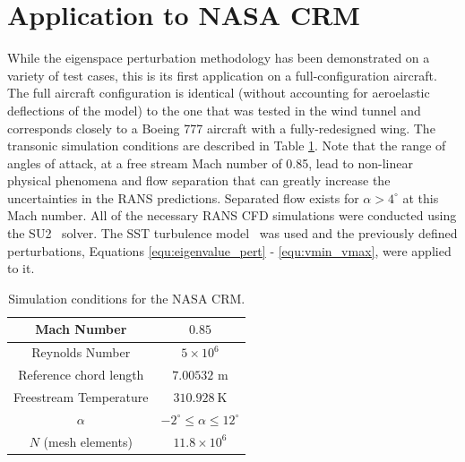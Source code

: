 \section{Application to NASA CRM} \label{sec:crm_rans_uq}

While the eigenspace perturbation methodology has been demonstrated on a variety of test cases, this is its first application on a full-configuration aircraft. The full aircraft configuration is identical (without accounting for aeroelastic deflections of the model) to the one that was tested in the wind tunnel and corresponds closely to a Boeing 777 aircraft with a fully-redesigned wing. The transonic simulation conditions are described in Table \ref{NASA_CRM_test_cond}. Note that the range of angles of attack, at a free stream Mach number of 0.85, lead to non-linear physical phenomena and flow separation that can greatly increase the uncertainties in the RANS predictions. Separated flow exists for $\alpha > 4^\circ$ at this Mach number. All of the necessary RANS CFD simulations were conducted using the SU2~\cite{su2_aiaajournal} solver. The SST turbulence model~\cite{menter1994two,menter2003ten} was used and the previously defined perturbations, Equations \eqref{equ:eigenvalue_pert} - \eqref{equ:vmin_vmax}, were applied to it. 

\begin{table}
\centering
    \renewcommand{\arraystretch}{1.2}
    \captionsetup{justification=centering}
    \caption{Simulation conditions for the NASA CRM.} 
    \begin{tabular}{|c|c|}
        \hline
        Mach Number & $0.85$ \\ \hline
        Reynolds Number & $5\times10^6$ \\ \hline
        Reference chord length & $7.00532$ m \\ \hline
        Freestream Temperature & $310.928~\text{K}$ \\ \hline
        $\alpha$ & $-2^\circ \leq \alpha \leq 12^\circ$ \\ \hline 
        $N$ (mesh elements) &  $11.8\times10^6$ \\ \hline
    \end{tabular}
    \label{NASA_CRM_test_cond}
\end{table}


